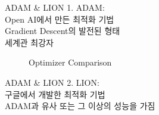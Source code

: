 \documentclass{beamer}
\begin{document}
\begin{frame}{ADAM \& LION}
    1. ADAM:\\
    Open AI에서 만든 최적화 기법\\
    Gradient Descent의 발전된 형태\\
    세계관 최강자\\
\begin{figure}[t]
  \centering
  \caption{Optimizer Comparison}
  \label{fig:optimizer-comparison}
\end{figure}

\end{frame}
\begin{frame}{ADAM \& LION}
    2. LION:\\
    구글에서 개발한 최적화 기법\\
    ADAM과 유사 또는 그 이상의 성능을 가짐\\
\end{frame}
\end{document}
